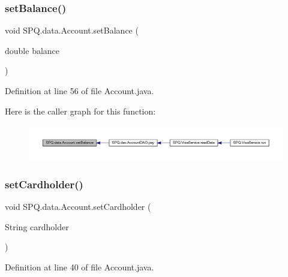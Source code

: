 \subsubsection{\texorpdfstring{set\+Balance()}{setBalance()}}
{\footnotesize\ttfamily void S\+P\+Q.\+data.\+Account.\+set\+Balance (\begin{DoxyParamCaption}\item[{double}]{balance }\end{DoxyParamCaption})}



Definition at line 56 of file Account.\+java.

Here is the caller graph for this function\+:\nopagebreak
\begin{figure}[H]
\begin{center}
\leavevmode
\includegraphics[width=350pt]{class_s_p_q_1_1data_1_1_account_a7ac2f177ba411765320259ed3a63b5b2_icgraph}
\end{center}
\end{figure}
\mbox{\label{class_s_p_q_1_1data_1_1_account_a4298cea2ae84ed5eae60f67fe61e433a}} 
\subsubsection{\texorpdfstring{set\+Cardholder()}{setCardholder()}}
{\footnotesize\ttfamily void S\+P\+Q.\+data.\+Account.\+set\+Cardholder (\begin{DoxyParamCaption}\item[{String}]{cardholder }\end{DoxyParamCaption})}



Definition at line 40 of file Account.\+java.

\mbox{\label{class_s_p_q_1_1data_1_1_account_afad9822abc150e4238b95280647d3e11}} 

